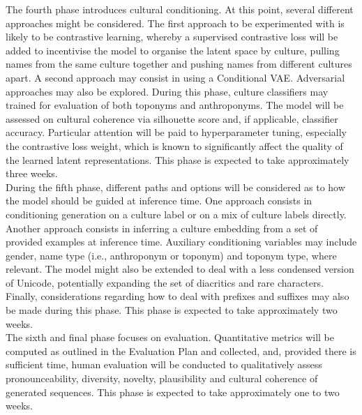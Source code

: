 \documentclass[Main.tex]{subfiles}
\begin{document}
The fourth phase introduces cultural conditioning. At this point, several different approaches might be considered. The first approach to be experimented with is likely to be contrastive learning, whereby a  supervised contrastive loss will be added to incentivise the model to organise the latent space by culture, pulling names from the same culture together and pushing names from different cultures apart. A second approach may consist in using a Conditional VAE. Adversarial approaches may also be explored. During this phase, culture classifiers may trained for evaluation of both toponyms and anthroponyms. The model will be assessed on cultural coherence via silhouette score and, if applicable, classifier accuracy. Particular attention will be paid to hyperparameter tuning, especially the contrastive loss weight, which is known to significantly affect the quality of the learned latent representations. This phase is expected to take approximately three weeks.\\

During the fifth phase, different paths and options will be considered as to how the model should be guided at inference time. One approach consists in conditioning generation on a culture label or on a mix of culture labels directly. Another approach consists in inferring a culture embedding from a set of provided examples at inference time. Auxiliary conditioning variables may include gender, name type (i.e., anthroponym or toponym) and toponym type, where relevant. The model might also be extended to deal with a less condensed version of Unicode, potentially expanding the set of diacritics and rare characters. Finally, considerations regarding how to deal with prefixes and suffixes may also be made during this phase. This phase is expected to take approximately two weeks.\\

The sixth and final phase focuses on evaluation. Quantitative metrics will be computed as outlined in the Evaluation Plan and collected, and, provided there is sufficient time, human evaluation will be conducted to qualitatively assess pronounceability, diversity, novelty, plausibility and cultural coherence of generated sequences. This phase is expected to take approximately one to two weeks.\\


\end{document}
